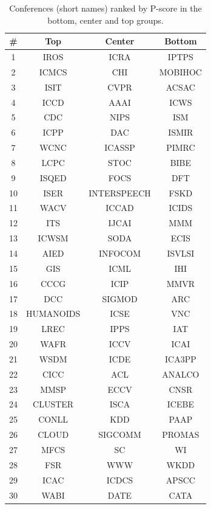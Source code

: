 \documentclass[notitlepage]{svjour3}
\begin{document}
\begin{table}[ht!]
  \small
  \centering
  \begin{tabular}{c c c c} 
  \toprule
  \# & Top & Center & Bottom \\ 
  \midrule
  1  & IROS      & ICRA        & IPTPS   \\
  2  & ICMCS     & CHI         & MOBIHOC \\
  3  & ISIT      & CVPR        & ACSAC   \\
  4  & ICCD      & AAAI        & ICWS    \\
  5  & CDC       & NIPS        & ISM     \\
  6  & ICPP      & DAC         & ISMIR   \\
  7  & WCNC      & ICASSP      & PIMRC   \\
  8  & LCPC      & STOC        & BIBE    \\
  9  & ISQED     & FOCS        & DFT     \\
  10 & ISER      & INTERSPEECH & FSKD    \\
  11 & WACV      & ICCAD       & ICIDS   \\
  12 & ITS       & IJCAI       & MMM     \\
  13 & ICWSM     & SODA        & ECIS    \\
  14 & AIED      & INFOCOM     & ISVLSI  \\
  15 & GIS       & ICML        & IHI     \\
  16 & CCCG      & ICIP        & MMVR    \\
  17 & DCC       & SIGMOD      & ARC     \\
  18 & HUMANOIDS & ICSE        & VNC     \\
  19 & LREC      & IPPS        & IAT     \\
  20 & WAFR      & ICCV        & ICAI    \\
  21 & WSDM      & ICDE        & ICA3PP  \\
  22 & CICC      & ACL         & ANALCO  \\
  23 & MMSP      & ECCV        & CNSR    \\
  24 & CLUSTER   & ISCA        & ICEBE   \\
  25 & CONLL     & KDD         & PAAP    \\
  26 & CLOUD     & SIGCOMM     & PROMAS  \\
  27 & MFCS      & SC          & WI      \\
  28 & FSR       & WWW         & WKDD    \\
  29 & ICAC      & ICDCS       & APSCC   \\
  30 & WABI      & DATE        & CATA    \\
  \bottomrule
  \end{tabular}
  \caption{Conferences (short names) ranked by P-score in the bottom, center and top groups.}
  \label{tab:conferences}
\end{table}
\end{document}
